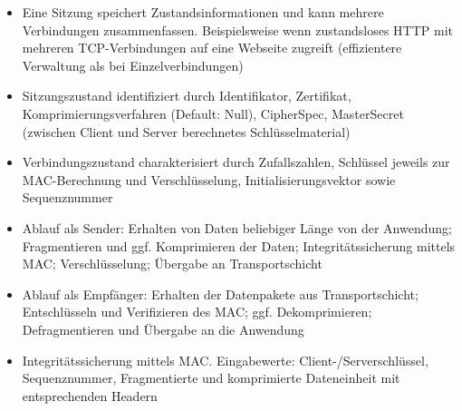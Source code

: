 \begin{itemize}
\begin{itemize}
		\item Eine Sitzung speichert Zustandsinformationen und kann mehrere Verbindungen zusammenfassen. Beispielsweise wenn zustandsloses HTTP mit mehreren TCP-Verbindungen auf eine Webseite zugreift (effizientere Verwaltung als bei Einzelverbindungen)
		\item Sitzungszustand identifiziert durch Identifikator, Zertifikat, Komprimierungsverfahren (Default: Null), CipherSpec, MasterSecret (zwischen Client und Server berechnetes Schlüsselmaterial)
		\item Verbindungszustand charakterisiert durch Zufallszahlen, Schlüssel jeweils zur MAC-Berechnung und Verschlüsselung, Initialisierungsvektor sowie Sequenznummer
		\item Ablauf als Sender: Erhalten von Daten beliebiger Länge von der Anwendung; Fragmentieren und ggf. Komprimieren der Daten; Integritätssicherung mittels MAC; Verschlüsselung; Übergabe an Transportschicht
		\item Ablauf als Empfänger: Erhalten der Datenpakete aus Transportschicht; Entschlüsseln und Verifizieren des MAC; ggf. Dekomprimieren; Defragmentieren und Übergabe an die Anwendung
		\item Integritätssicherung mittels MAC. Eingabewerte: Client-/Serverschlüssel, Sequenznummer, Fragmentierte und komprimierte Dateneinheit mit entsprechenden Headern
	\end{itemize}
\end{itemize}


